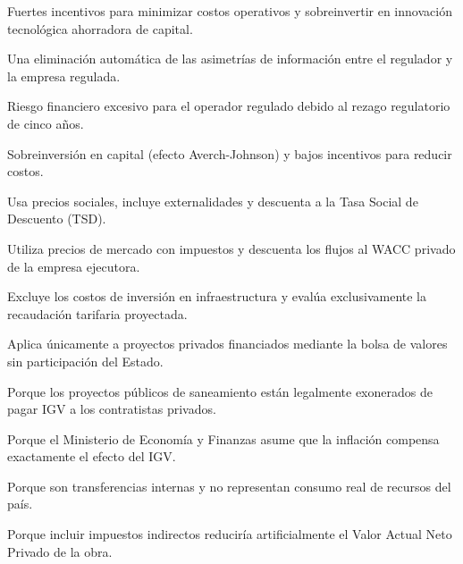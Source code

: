 \begin{opts}
    \item Fuertes incentivos para minimizar costos operativos y sobreinvertir en innovación tecnológica ahorradora de capital.
    \item Una eliminación automática de las asimetrías de información entre el regulador y la empresa regulada.
    \item Riesgo financiero excesivo para el operador regulado debido al rezago regulatorio de cinco años.
    \item Sobreinversión en capital (efecto Averch-Johnson) y bajos incentivos para reducir costos.
\end{opts}

\begin{opts}
    \item Usa precios sociales, incluye externalidades y descuenta a la Tasa Social de Descuento (TSD).
    \item Utiliza precios de mercado con impuestos y descuenta los flujos al WACC privado de la empresa ejecutora.
    \item Excluye los costos de inversión en infraestructura y evalúa exclusivamente la recaudación tarifaria proyectada.
    \item Aplica únicamente a proyectos privados financiados mediante la bolsa de valores sin participación del Estado.
\end{opts}

\begin{opts}
    \item Porque los proyectos públicos de saneamiento están legalmente exonerados de pagar IGV a los contratistas privados.
    \item Porque el Ministerio de Economía y Finanzas asume que la inflación compensa exactamente el efecto del IGV.
    \item Porque son transferencias internas y no representan consumo real de recursos del país.
    \item Porque incluir impuestos indirectos reduciría artificialmente el Valor Actual Neto Privado de la obra.
\end{opts}

